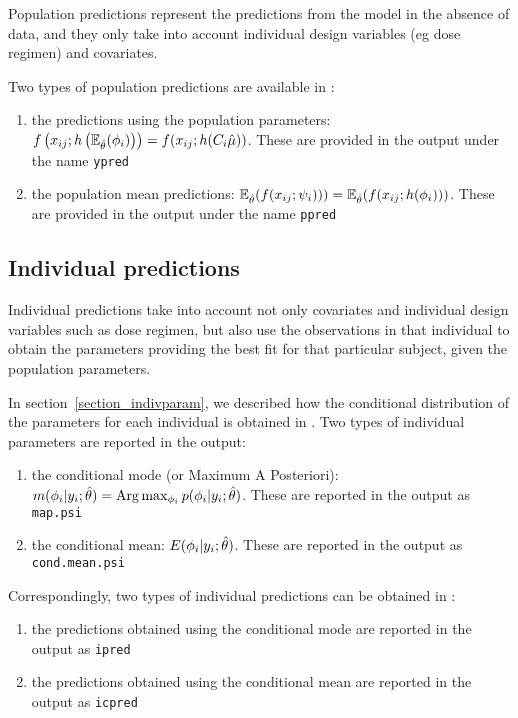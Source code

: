 Population predictions represent the predictions from the model in the absence of data, and they only take into account individual design variables (eg dose regimen) and covariates.

Two types of population predictions are available in \monolix:
\begin{enumerate}
  \item the predictions using the population parameters: $f\left(x_{ij} ; h\left( \mathbb{E}_{\hat{\theta}}(\phigi) \right) \right)= f(x_{ij} ; h(C_i \hat{\fixed_effect}))$. These are provided in the output under the name \texttt{ypred}
  \item the population mean predictions:  $\mathbb{E}_{\hat{\theta}}(f(x_{ij} ; {\psi_i}) ))=\mathbb{E}_{\hat{\theta}}(f(x_{ij} ; h({{\phi}_i}) ))$. These are provided in the output under the name \texttt{ppred}
\end{enumerate}

\subsection{Individual predictions}

Individual predictions take into account not only covariates and individual design variables such as dose regimen, but also use the observations in that individual to obtain the parameters providing the best fit for that particular subject, given the population parameters.

In section~\ref{section_indivparam}, we described how the conditional distribution of the parameters for each individual is obtained in \monolix. Two types of individual parameters are reported in the output:
\begin{enumerate}
\item the conditional mode (or Maximum A Posteriori): $ m({{\phi}_i}|y_i;\hat{\theta})={\rm Arg}\max_{{\phi}_i} p({{\phi}_i}|y_i;\hat{\theta})$. These are reported in the output as \texttt{map.psi}
\item the conditional mean: $ E({{\phi}_i}|y_i;\hat{\theta})$. These are reported in the output as \texttt{cond.mean.psi}
\end{enumerate}
Correspondingly, two types of individual predictions can be obtained in \monolix:
\begin{enumerate}
\item the predictions obtained using the conditional mode are reported in the output as \texttt{ipred}
\item the predictions obtained using the conditional mean are reported in the output as \texttt{icpred}
\end{enumerate}

